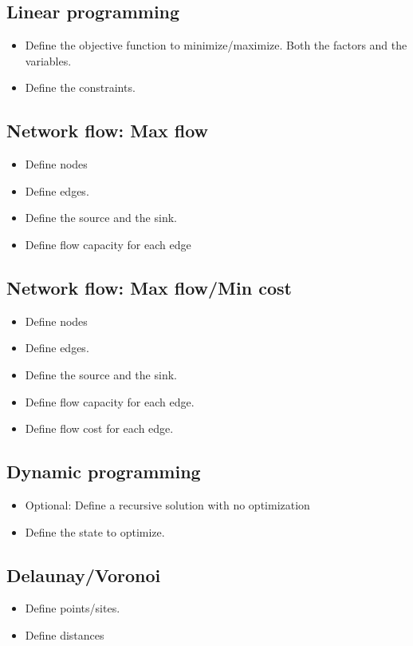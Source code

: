 \documentclass[guide.tex]{subfiles}
\begin{document}
\subsection{Linear programming}
\begin{itemize}
  \item Define the objective function to minimize/maximize. Both the factors and the variables.
  \item Define the constraints.
\end{itemize}

\subsection{Network flow: Max flow}
\begin{itemize}
  \item Define nodes
  \item Define edges.
  \item Define the source and the sink.
  \item Define flow capacity for each edge
\end{itemize}

\subsection{Network flow: Max flow/Min cost}
\begin{itemize}
  \item Define nodes
  \item Define edges.
  \item Define the source and the sink.
  \item Define flow capacity for each edge.
  \item Define flow cost for each edge.
\end{itemize}

\subsection{Dynamic programming}
\begin{itemize}
  \item Optional: Define a recursive solution with no optimization
  \item Define the state to optimize.
\end{itemize}

\subsection{Delaunay/Voronoi}
\begin{itemize}
  \item Define points/sites.
  \item Define distances
\end{itemize}
\end{document}
